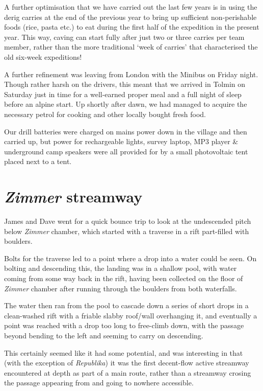 A further optimisation that we have carried out the last few years is in
using the derig carries at the end of the previous year to bring up
sufficient non-perishable foods (rice, pasta etc.) to eat during the
first half of the expedition in the present year. This way, caving can
start fully after just two or three carries per team member, rather than
the more traditional `week of carries' that characterised the old
six-week expeditions!

A further refinement was leaving from London with the Minibus on Friday
night. Though rather harsh on the drivers, this meant that we arrived in
Tolmin on Saturday just in time for a well-earned proper meal and a full
night of sleep before an alpine start. Up shortly after dawn, we had
managed to acquire the necessary petrol for cooking and other locally
bought fresh food.

Our drill batteries were charged on mains power down in the village and
then carried up, but power for rechargeable lights, survey laptop, MP3
player \& underground camp speakers were all provided for by a small
photovoltaic tent placed next to a tent.

\hypertarget{zimmer-streamway}{%
\section{\texorpdfstring{\emph{Zimmer}
streamway}{Zimmer streamway}}\label{zimmer-streamway}}

James and Dave went for a quick bounce trip to look at the undescended
pitch below \emph{Zimmer} chamber, which started with a traverse in a
rift part-filled with boulders.

Bolts for the traverse led to a point where a drop into a water could be
seen. On bolting and descending this, the landing was in a shallow pool,
with water coming from some way back in the rift, having been collected
on the floor of \emph{Zimmer} chamber after running through the boulders
from both waterfalls.

The water then ran from the pool to cascade down a series of short drops
in a clean-washed rift with a friable slabby roof/wall overhanging it,
and eventually a point was reached with a drop too long to free-climb
down, with the passage beyond bending to the left and seeming to carry
on descending.

This certainly seemed like it had some potential, and was interesting in
that (with the exception of \emph{Republika}) it was the first
decent-flow active streamway encountered at depth as part of a main
route, rather than a streamway crosing the passage appearing from and
going to nowhere accessible.

